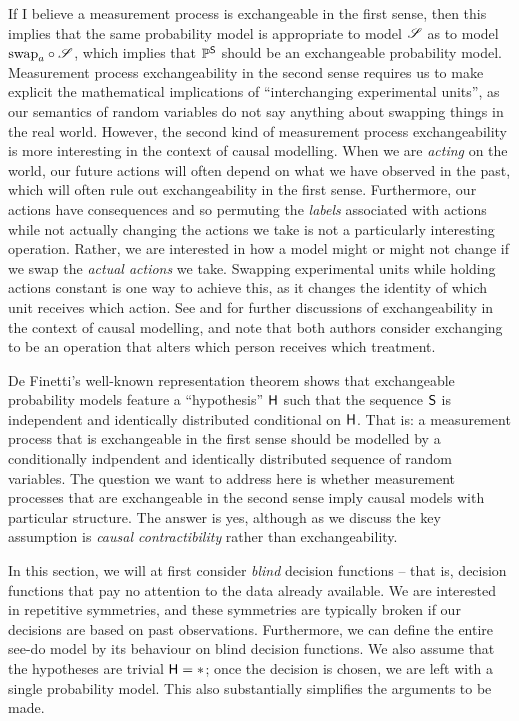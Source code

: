 If I believe a measurement process is exchangeable in the first sense, then this implies that the same probability model is appropriate to model $\mathscr{S}$ as to model $\text{swap}_a\circ \mathscr{S}$, which implies that $\mathbb{P}^{\mathsf{S}}$ should be an exchangeable probability model. Measurement process exchangeability in the second sense requires us to make explicit the mathematical implications of ``interchanging experimental units'', as our semantics of random variables do not say anything about swapping things in the real world. However, the second kind of measurement process exchangeability is more interesting in the context of causal modelling. When we are \emph{acting} on the world, our future actions will often depend on what we have observed in the past, which will often rule out exchangeability in the first sense. Furthermore, our actions have consequences and so permuting the \emph{labels} associated with actions while not actually changing the actions we take is not a particularly interesting operation. Rather, we are interested in how a model might or might not change if we swap the \emph{actual actions} we take. Swapping experimental units while holding actions constant is one way to achieve this, as it changes the identity of which unit receives which action. See \citet{dawid_decision-theoretic_2020} and \citet{greenland_identifiability_1986} for further discussions of exchangeability in the context of causal modelling, and note that both authors consider exchanging to be an operation that alters which person receives which treatment.

De Finetti's well-known representation theorem shows that exchangeable probability models feature a ``hypothesis'' $\mathsf{H}$ such that the sequence $\mathsf{S}$ is independent and identically distributed conditional on $\mathsf{H}$. That is: a measurement process that is exchangeable in the first sense should be modelled by a conditionally indpendent and identically distributed sequence of random variables. The question we want to address here is whether measurement processes that are exchangeable in the second sense imply causal models with particular structure. The answer is yes, although as we discuss the key assumption is \emph{causal contractibility} rather than exchangeability.

In this section, we will at first consider \emph{blind} decision functions -- that is, decision functions that pay no attention to the data already available. We are interested in repetitive symmetries, and these symmetries are typically broken if our decisions are based on past observations. Furthermore, we can define the entire see-do model by its behaviour on blind decision functions. We also assume that the hypotheses are trivial $\mathsf{H}=*$; once the decision is chosen, we are left with a single probability model. This also substantially simplifies the arguments to be made.

